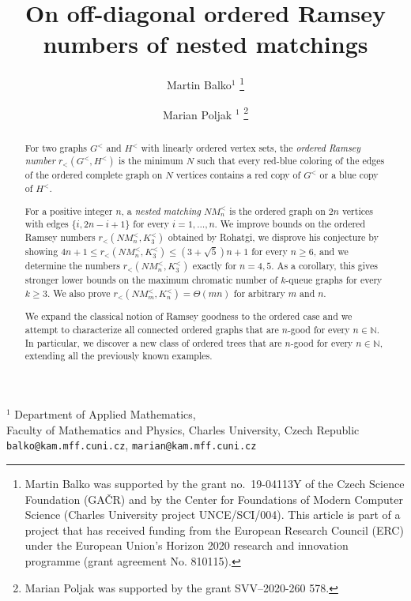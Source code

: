 \documentclass[11pt,a4paper]{article}
\theoremstyle{remark}
\def\inst#1{$^{#1}$}
\begin{document}
\title{On off-diagonal ordered Ramsey numbers of nested matchings}

\author{Martin Balko\inst{1} \thanks{Martin Balko was supported by the grant no.~19-04113Y of the Czech Science Foundation (GA\v{C}R) and by the Center for Foundations of Modern Computer Science (Charles University project UNCE/SCI/004). This article is part of a project that has received funding from the European Research Council (ERC) under the European Union's Horizon 2020 research and innovation programme (grant agreement No. 810115).} 
\and
Marian Poljak \inst{1} \thanks{Marian Poljak was supported by the grant
SVV–2020-260 578.} 
}

\maketitle

\begin{center}
{\footnotesize
\inst{1} 
Department of Applied Mathematics, \\
Faculty of Mathematics and Physics, Charles University, Czech Republic \\
\texttt{balko@kam.mff.cuni.cz}, \texttt{marian@kam.mff.cuni.cz}
}
\end{center}

\begin{abstract}
For two graphs $G^<$ and $H^<$ with linearly ordered vertex sets, the \emph{ordered Ramsey number} $r_<(G^<,H^<)$ is the minimum $N$ such that every red-blue coloring of the edges of the ordered complete graph on $N$ vertices contains a red copy of $G^<$ or a blue copy of $H^<$.

For a positive integer $n$, a \emph{nested matching} $NM^<_n$ is the ordered graph on $2n$ vertices with edges $\{i,2n-i+1\}$ for every $i=1,\dots,n$.
We improve bounds on the ordered Ramsey numbers $r_<(NM^<_n,K^<_3)$ obtained by Rohatgi, we disprove his conjecture by showing $4n+1 \leq r_<(NM^<_n,K^<_3) \leq (3+\sqrt{5})n+1$ for every $n \geq 6$, and we determine the numbers $r_<(NM^<_n,K^<_3)$ exactly for $n=4,5$.
As a corollary, this gives stronger lower bounds on the maximum chromatic number of $k$-queue graphs for every $k \geq 3$.
We also prove $r_<(NM^<_m,K^<_n)=\Theta(mn)$ for arbitrary $m$ and $n$.

We expand the classical notion of Ramsey goodness to the ordered case and we attempt to characterize all connected ordered graphs that are $n$-good for every $n\in\mathbb{N}$.
In particular, we discover a new class of ordered trees that are $n$-good for every $n \in \mathbb{N}$, extending all the previously known examples.
\end{abstract}
\end{document}
